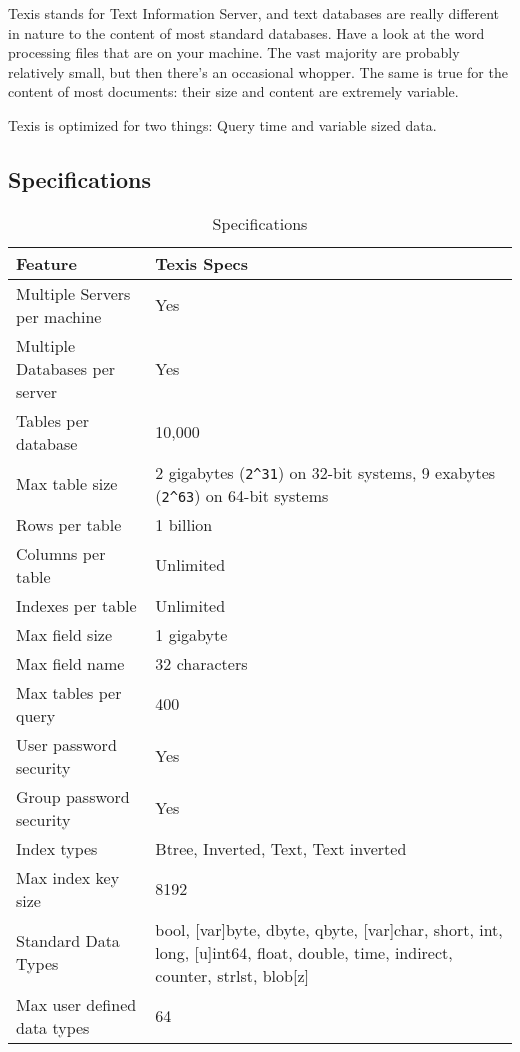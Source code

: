 Texis stands for Text Information Server, and text databases are
really different in nature to the content of most standard databases.
Have a look at the word processing files that are on your machine.
The vast majority are probably relatively small, but then there's an
occasional whopper.  The same is true for the content of most
documents:  their size and content are extremely variable.

Texis is optimized for two things:  Query time and variable sized
data.

\subsection{Specifications}

\begin{table}[h]
\caption{Specifications}{\label{tab:specs}}
\begin{center}
\begin{tabular}{|l|l|} \hline
Feature                        & Texis Specs           \\ \hline\hline
Multiple Servers per machine   & Yes                   \\
Multiple Databases per server  & Yes                   \\
Tables per database            & 10,000                \\
Max table size                 & \begin{minipage}[t]{3in}2 gigabytes (\verb`2^31`) on 32-bit systems, 9 exabytes (\verb`2^63`) on 64-bit systems\end{minipage}     \\
Rows per table                 & 1 billion             \\
Columns per table              & Unlimited             \\
Indexes per table              & Unlimited             \\
Max field size                 & 1 gigabyte            \\
Max field name                 & 32 characters         \\
Max tables per query           & 400                   \\
User password security         & Yes                   \\
Group password security        & Yes                   \\
Index types                    & Btree, Inverted, Text, Text inverted \\
Max index key size             & 8192                  \\
Standard Data Types            & \parbox[t]{3in}{bool, [var]byte, dbyte, qbyte, [var]char, short, int, long, [u]int64, float, double, time, indirect, counter, strlst, blob[z]} \\
Max user defined data types    & 64                          \\ \hline
\end{tabular}
\end{center}
\end{table}

